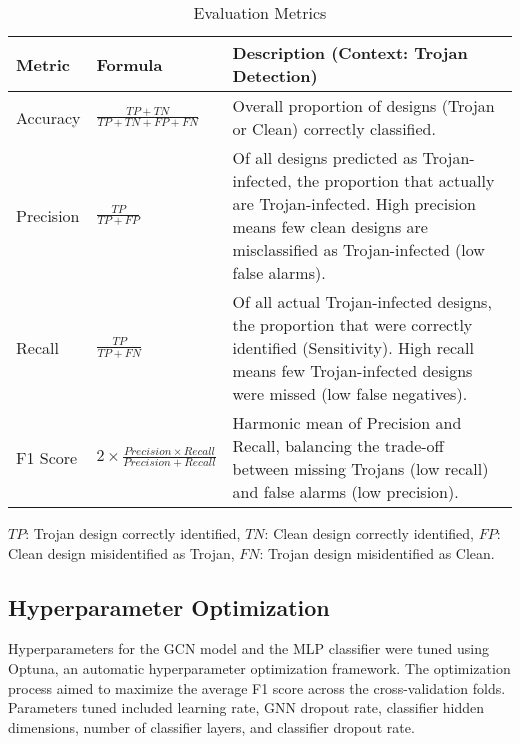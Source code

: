 \documentclass[sigplan,screen]{acmart}
\begin{document}
\begin{table*}[ht] %
  \caption{Evaluation Metrics}
  \label{tab:eval_metrics}
  \centering
  \begin{tabular}{llp{12cm}} %
    \toprule
    \textbf{Metric} & \textbf{Formula} & \textbf{Description (Context: Trojan Detection)} \\
    \midrule
    Accuracy & $\frac{TP+TN}{TP+TN+FP+FN}$ & Overall proportion of designs (Trojan or Clean) correctly classified. \\
    \addlinespace
    Precision & $\frac{TP}{TP+FP}$ & Of all designs predicted as Trojan-infected, the proportion that actually are Trojan-infected. High precision means few clean designs are misclassified as Trojan-infected (low false alarms). \\
    \addlinespace
    Recall & $\frac{TP}{TP+FN}$ & Of all actual Trojan-infected designs, the proportion that were correctly identified (Sensitivity). High recall means few Trojan-infected designs were missed (low false negatives). \\
    \addlinespace
    F1 Score & $2 \times \frac{Precision \times Recall}{Precision + Recall}$ & Harmonic mean of Precision and Recall, balancing the trade-off between missing Trojans (low recall) and false alarms (low precision). \\
    \bottomrule
  \end{tabular} %
  \vspace{2pt} %
  \footnotesize{$TP$: Trojan design correctly identified, $TN$: Clean design correctly identified, $FP$: Clean design misidentified as Trojan, $FN$: Trojan design misidentified as Clean.}
\end{table*} %

\subsection{Hyperparameter Optimization}
Hyperparameters for the GCN model and the MLP classifier were tuned using Optuna, an automatic hyperparameter optimization framework. The optimization process aimed to maximize the average F1 score across the cross-validation folds. Parameters tuned included learning rate, GNN dropout rate, classifier hidden dimensions, number of classifier layers, and classifier dropout rate.
\end{document}
